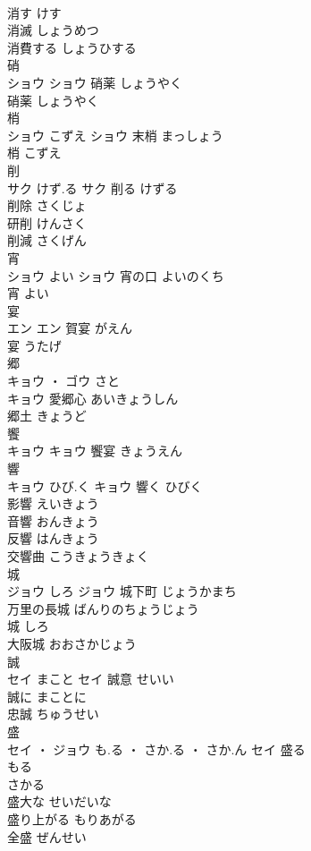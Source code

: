 \documentclass[8pt]{extreport}
\begin{document}
\begin{CJK}{UTF8}{min}
\\	消す	けす	
\\	消滅	しょうめつ	
\\	消費する	しょうひする	
\\	硝	
\\	ショウ		ショウ	硝薬	しょうやく	
\\	硝薬	しょうやく	
\\	梢	
\\	ショウ	こずえ	ショウ													末梢	まっしょう	
\\	梢	こずえ	
\\	削	
\\	サク	けず.る	サク	削る	けずる	
\\	削除	さくじょ	
\\	研削	けんさく	
\\	削減	さくげん	
\\	宵	
\\	ショウ	よい	ショウ	宵の口	よいのくち	
\\	宵	よい	
\\	宴	
\\	エン		エン													賀宴	がえん	
\\	宴	うたげ	
\\	郷	
\\	キョウ ・ ゴウ	さと
\\	キョウ													愛郷心	あいきょうしん	
\\	郷土	きょうど	
\\	饗	
\\	キョウ		キョウ													饗宴	きょうえん	
\\	響	
\\	キョウ	ひび.く	キョウ	響く	ひびく	
\\	影響	えいきょう	
\\	音響	おんきょう	
\\	反響	はんきょう	
\\	交響曲	こうきょうきょく	
\\	城	
\\	ジョウ	しろ	ジョウ	城下町	じょうかまち	
\\	万里の長城	ばんりのちょうじょう	
\\	城	しろ	
\\	大阪城	おおさかじょう	
\\	誠	
\\	セイ	まこと	セイ	誠意	せいい	
\\	誠に	まことに	
\\	忠誠	ちゅうせい	
\\	盛	
\\	セイ ・ ジョウ	も.る ・ さか.る ・ さか.ん	セイ	盛る 
\\	もる 
\\	さかる	
\\	盛大な	せいだいな	
\\	盛り上がる	もりあがる	
\\	全盛	ぜんせい	
\end{CJK}
\end{document}
